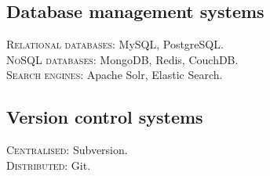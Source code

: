 \documentclass[11pt]{article}
\begin{document}
\subsection*{Database management systems}
\noindent
\textsc{Relational databases:} MySQL, PostgreSQL.\\
\textsc{NoSQL databases:} MongoDB, Redis, CouchDB.\\
\textsc{Search engines:} Apache Solr, Elastic Search.

\subsection*{Version control systems}
\noindent
\textsc{Centralised:} Subversion.\\
\textsc{Distributed:} Git.
\end{document}
